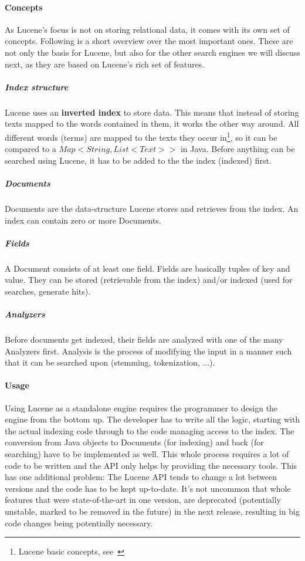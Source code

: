 \paragraph{Concepts}

As Lucene's focus is not on storing relational data, it comes with its own set of concepts. Following is a short overview over the most important ones. These are not only the basis for Lucene, but also for the other search engines we will discuss next, as they are based on Lucene's rich set of features.

\subparagraph{Index structure}
Lucene uses an \textbf{inverted index} to store data. This means that instead of storing texts mapped to the words contained in them, it works the other way around. All different words (terms) are mapped to the texts they occur in\footnote{Lucene basic concepts, see~\cite{lucene_basic_concepts}}, so it can be compared to a \(Map<String, List<Text>>\) in Java. Before anything can be searched using Lucene, it has to be added to the the index (indexed) first.

\subparagraph{Documents}
Documents are the data-structure Lucene stores and retrieves from the index. An index can contain zero or more Documents.

\subparagraph{Fields}
A Document consists of at least one field. Fields are basically tuples of key and value. They can be stored (retrievable from the index) and/or indexed (used for searches, generate hits).

\subparagraph{Analyzers}
Before documents get indexed, their fields are analyzed with one of the many Analyzers first. Analysis is the process of modifying the input in a manner such that it can be searched upon (stemming, tokenization, ...).

\pagebreak

\paragraph{Usage}
Using Lucene as a standalone engine requires the programmer to design the engine from the bottom up. The developer has to write all the logic, starting with the actual indexing code through to the code managing access to the index. The conversion from Java objects to Documents (for indexing) and back (for searching) have to be implemented as well. This whole process requires a lot of code to be written and the API only helps by providing the necessary tools. This has one additional problem: The Lucene API tends to change a lot between versions and the code has to be kept up-to-date. It's not uncommon that whole features that were state-of-the-art in one version, are deprecated (potentially unstable, marked to be removed in the future) in the next release, resulting in big code changes being potentially necessary.


